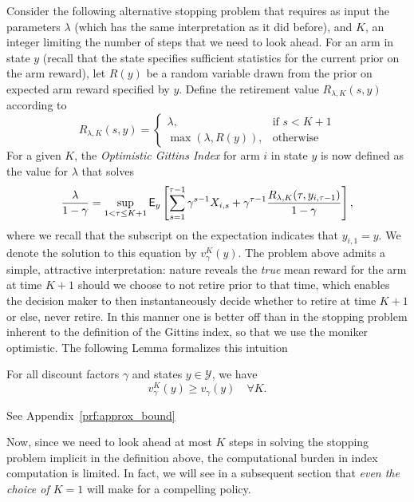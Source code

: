 Consider the following alternative stopping problem that requires as input the parameters $\lambda$ (which has the same interpretation as it did before), and $K$, an integer limiting the number of steps that we need to look ahead. For an arm in state $y$ (recall that the state specifies sufficient statistics for the current prior on the arm reward), let $R(y)$ be a random variable drawn from the prior on expected arm reward specified by $y$. Define the retirement value $R_{\lambda,K}(s,y)$ according to 
\[
R_{\lambda,K}(s, y) = 
\begin{cases}
\lambda ,& \text{if } s < K+1\\
\max\left(\lambda, R(y) \right), & \text{otherwise}
\end{cases}
\]
For a given $K$, the \emph{Optimistic Gittins Index} for arm $i$ in state $y$ is now defined as the value for $\lambda$ that solves
\begin{equation} \label{eqn:ogi_general}
\frac{ \lambda}{1-\gamma} = \sup_{1 < \tau \leq K+1}
\mathsf{E}_y\left[
	\sum_{s=1}^{\tau-1} \gamma^{s-1}X_{i,s} + \gamma^{\tau-1} \frac{R_{\lambda,K}(\tau, y_{i,\tau-1})}{1-\gamma}
\right],
\end{equation}
where we recall that the subscript on the expectation indicates that $y_{i,1} = y$. 
We denote the solution to this equation by $v_\gamma^{K}(y)$.
The problem above admits a simple, attractive interpretation: nature reveals the {\em true} mean reward for the arm at time $K+1$ should we choose to not retire prior to that time, which enables the decision maker to then instantaneously decide whether to retire at time $K+1$ or else, never retire. In this manner one is better off than in the stopping problem inherent to the definition of the Gittins index, so that we use the moniker optimistic. The following Lemma formalizes this intuition

\begin{lemma} \label{lemma:approx_bound}
	For all discount factors $\gamma$ and states $y \in \mathcal Y$, we have 
	\[
	v_\gamma^{K}(y) \geq v_\gamma(y) \quad \forall K.
	\]
\end{lemma}
\begin{myproof}[Proof]
	See Appendix~\ref{prf:approx_bound}%
\end{myproof}

Now, since we need to look ahead at most $K$ steps in solving the stopping problem implicit in the definition above, the computational burden in index computation is limited. In fact, we will see in a subsequent section that {\em even the choice of $K=1$} will make for a compelling policy. 


